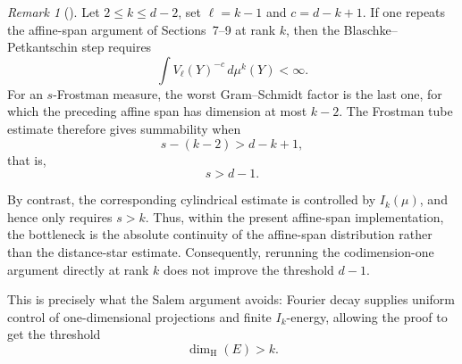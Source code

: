 \documentclass[11pt]{article}
\theoremstyle{remark}
\newtheorem{remark}[theorem]{Remark}
\numberwithin{equation}{section}
\newcommand{\1}{\mathbf 1}
\begin{document}
\begin{remark}[]
\label{rem:affine-span-scope}
Let $2\le k\le d-2$, set $\ell=k-1$ and
$c=d-k+1$.  If one repeats the affine-span argument of
Sections~7--9 at rank $k$, then the Blaschke--Petkantschin step requires
\[
\int V_\ell(Y)^{-c}\,d\mu^k(Y)<\infty.
\]
For an $s$-Frostman measure, the worst Gram--Schmidt factor is the last
one, for which the preceding affine span has dimension at most $k-2$.
The Frostman tube estimate therefore gives summability when
\[
s-(k-2)>d-k+1,
\]
that is,
\[
s>d-1.
\]

By contrast, the corresponding cylindrical estimate is controlled by
$I_k(\mu)$, and hence only requires $s>k$.  Thus, within the present
affine-span implementation, the bottleneck is the absolute continuity of
the affine-span distribution rather than the distance-star estimate.
Consequently, rerunning the codimension-one argument directly at rank
$k$ does not improve the threshold $d-1$.

This is precisely what the Salem argument avoids: Fourier decay supplies
uniform control of one-dimensional projections and finite $I_k$-energy,
allowing the proof to get the threshold
\[
\dim_{\mathrm H}(E)>k.
\]
\end{remark}
\end{document}
